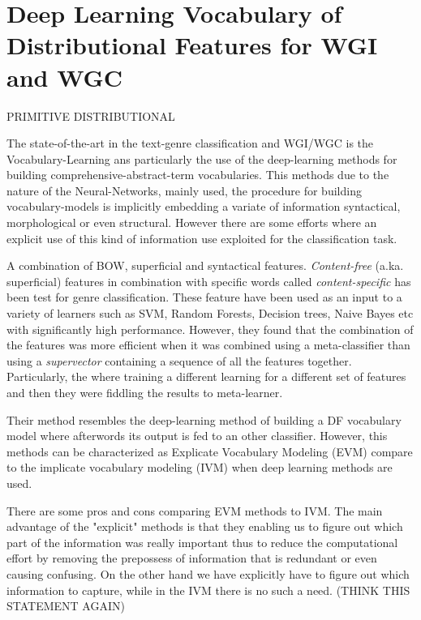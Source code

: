 \section{Deep Learning Vocabulary of Distributional Features for WGI and WGC}\label{chap:relevant_work:sec:intro}


PRIMITIVE DISTRIBUTIONAL \parencite{kim2010formulating} 


The state-of-the-art in the text-genre classification and WGI/WGC is the Vocabulary-Learning ans particularly the use of the deep-learning methods for building comprehensive-abstract-term vocabularies. This methods due to the nature of the Neural-Networks, mainly used,  the procedure for building vocabulary-models is implicitly embedding a variate of information syntactical, morphological or even structural. However there are some efforts where an explicit use of this kind of information use exploited for the classification task. 

A combination of BOW, superficial and syntactical features. \textit{Content-free} (a.ka. superficial) features in combination with specific words called \textit{content-specific} has been test for genre classification. These feature have been used as an input to a variety of learners such as SVM, Random Forests, Decision trees, Naive Bayes etc with significantly high performance. However, they found that the combination of the features was more efficient when it was combined using a meta-classifier than using a \textit{supervector} containing a sequence of all the features together. Particularly, the where training a different learning for a different set of features and then they were fiddling the results to meta-learner\parencite{lee2017text}.

Their method resembles the deep-learning method of building a DF vocabulary model where afterwords its output is fed to an other classifier. However, this methods can be characterized as Explicate Vocabulary Modeling (EVM) compare to the implicate vocabulary modeling (IVM) when deep learning methods are used.

There are some pros and cons comparing EVM methods to IVM. The main advantage of the "explicit" methods is that they enabling us to figure out which part of the information was really important thus to reduce the computational effort by removing the prepossess of information that is redundant or even causing confusing. On the other hand we have explicitly have to figure out which information to capture, while in the IVM there is no such a need. (THINK THIS STATEMENT AGAIN)

